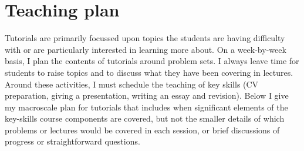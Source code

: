 \chapter{Teaching plan}\label{ap:plan}

Tutorials are primarily focussed upon topics the students are having difficulty with or are particularly interested in learning more about. On a week-by-week basis, I plan the contents of tutorials around problem sets. I always leave time for students to raise topics and to discuss what they have been covering in lectures. Around these activities, I must schedule the teaching of key skills (CV preparation, giving a presentation, writing an essay and revision). Below I give my macroscale plan for tutorials that includes when significant elements of the key-skills course components are covered, but not the smaller details of which problems or lectures would be covered in each session, or brief discussions of progress or straightforward questions.

